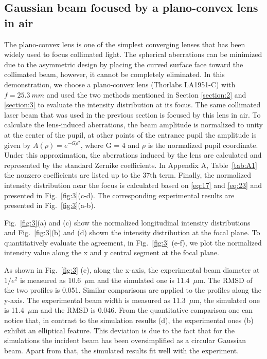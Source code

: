 \documentclass[9pt,twocolumn,twoside]{osajnl}
\begin{document}
\subsection{Gaussian beam focused by a plano-convex lens in air}
The plano-convex lens is one of the simplest converging lenses that has been widely used to focus collimated light. The spherical aberrations can be minimized due to the asymmetric design by placing the curved surface face toward the collimated beam, however, it cannot be completely eliminated. In this demonstration, we choose a plano-convex lens (Thorlabs LA1951-C) with $f = 25.3~mm$ and used the two methods mentioned in Section \ref{section:2} and \ref{section:3} to evaluate the intensity distribution at its focus. The same collimated laser beam that was used in the previous section is focused by this lens in air. To calculate the lens-induced aberrations,
the beam amplitude is normalized to unity at the center of the pupil, at other points of the entrance pupil the amplitude is given by $A(\rho)=e^{-G\rho^2}$, where G = 4 and $\rho$ is the normalized pupil coordinate. Under this approximation, the aberrations induced by the lens are calculated and represented by the standard Zernike coefficients. In Appendix A, Table~\ref{tab:A1} the nonzero coefficients are listed up to the 37th term. Finally, the normalized intensity distribution near the focus is calculated based on \eqref{eq:17} and \eqref{eq:23} and presented in Fig.~\ref{fig:3}(c-d). The corresponding experimental results are presented in Fig.~\ref{fig:3}(a-b).

Fig.~\ref{fig:3}(a) and (c) show the normalized longitudinal intensity distributions and Fig.~\ref{fig:3}(b) and (d) shown the intensity distribution at the focal plane. To quantitatively evaluate the agreement, in Fig.~\ref{fig:3} (e-f), we plot the normalized intensity value along the x and y central segment at the focal plane.

As shown in Fig.~\ref{fig:3} (e), along the x-axis, the experimental beam diameter at $1/e^2$ is measured as 10.6~$\mu$m and the simulated one is 11.4~$\mu$m. The RMSD of the two profiles is 0.051. Similar comparisons are applied to the profiles along the y-axis. The experimental beam width is measured as 11.3~$\mu$m, the simulated one is 11.4~$\mu$m and the RMSD is 0.046. From the quantitative comparison one can notice that, in contrast to the simulation results (d), the experimental ones (b) exhibit an elliptical feature. This deviation is due to the fact that for the simulations the incident beam has been oversimplified as a circular Gaussian beam. Apart from that, the simulated results fit well with the experiment. 
\end{document}
